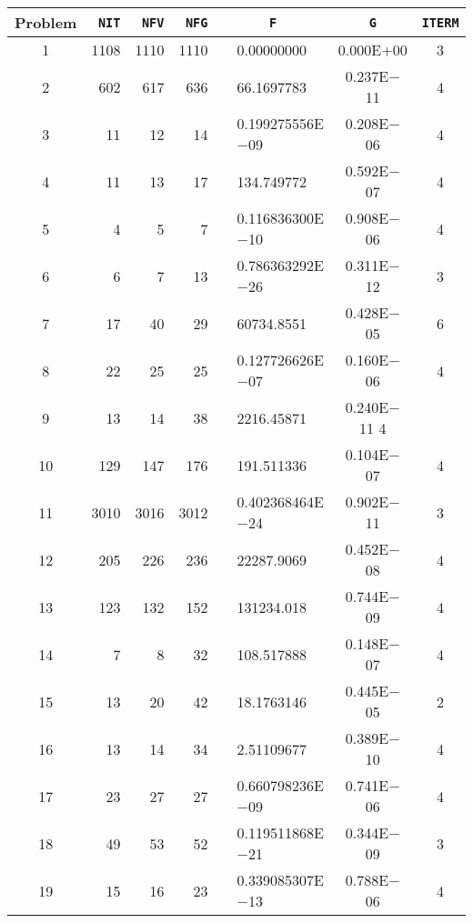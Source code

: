\documentclass{esub2acm}
\begin{document}
\begin{table}
\footnotesize
\centering
\begin{tabular}{c|rrrr@{}lcc} \hline
Problem\rule[-2pt]{0pt}{12pt} & {\tt NIT} & {\tt NFV} & {\tt NFG} & \multicolumn{2}{c}{\tt F} & {\tt G} & {\tt ITERM} \\ \hline
1\rule[-2pt]{0pt}{12pt} &   1108    &   1110    &   1110    &       &   0.00000000  &   0.000E+00   &   3   \\
2   &   602 &   617 &   636 &       &   66.1697783  &   0.237E$-$11 &   4   \\
3   &   11  &   12  &   14  &       &   0.199275556E$-$09   &   0.208E$-$06 &   4   \\
4   &   11  &   13  &   17  &       &   134.749772  &   0.592E$-$07 &   4   \\
5   &   4   &   5   &   7   &       &   0.116836300E$-$10   &   0.908E$-$06 &   4   \\
6   &   6   &   7   &   13  &       &   0.786363292E$-$26   &   0.311E$-$12 &   3   \\
7   &   17  &   40  &   29  &       &   60734.8551  &   0.428E$-$05 &   6   \\
8   &   22  &   25  &   25  &       &   0.127726626E$-$07   &   0.160E$-$06 &   4   \\
9   &   13  &   14  &   38  &       &   2216.45871  &   0.240E$-$11     4   \\
10  &   129 &   147 &   176 &       &   191.511336  &   0.104E$-$07 &   4   \\
11  &   3010    &   3016    &   3012    &       &   0.402368464E$-$24   &   0.902E$-$11 &   3   \\
12  &   205 &   226 &   236 &       &   22287.9069  &   0.452E$-$08 &   4   \\
13  &   123 &   132 &   152 &       &   131234.018  &   0.744E$-$09 &   4   \\
14  &   7   &   8   &   32  &       &   108.517888  &   0.148E$-$07 &   4   \\
15  &   13  &   20  &   42  &       &   18.1763146  &   0.445E$-$05 &   2   \\
16  &   13  &   14  &   34  &       &   2.51109677  &   0.389E$-$10 &   4   \\
17  &   23  &   27  &   27  &       &   0.660798236E$-$09   &   0.741E$-$06 &   4   \\
18  &   49  &   53  &   52  &       &   0.119511868E$-$21   &   0.344E$-$09 &   3   \\
19  &   15  &   16  &   23  &       &   0.339085307E$-$13   &   0.788E$-$06 &   4   \\

\end{tabular}
\end{table}
\end{document}
